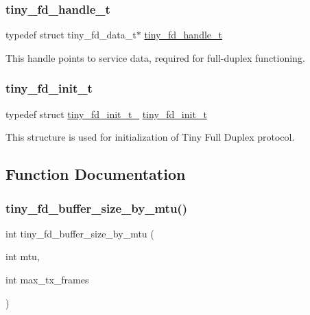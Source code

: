 \subsubsection{\texorpdfstring{tiny\+\_\+fd\+\_\+handle\+\_\+t}{tiny\_fd\_handle\_t}}
{\footnotesize\ttfamily typedef struct tiny\+\_\+fd\+\_\+data\+\_\+t$\ast$ \hyperlink{group__FULL__DUPLEX__API_ga91e6b79431fe38570fb102701ef0b7e8}{tiny\+\_\+fd\+\_\+handle\+\_\+t}}

This handle points to service data, required for full-\/duplex functioning. \mbox{\label{group__FULL__DUPLEX__API_gad19ac27f4ba1d2b807e0a440b0c927d2}} 
\subsubsection{\texorpdfstring{tiny\+\_\+fd\+\_\+init\+\_\+t}{tiny\_fd\_init\_t}}
{\footnotesize\ttfamily typedef struct \hyperlink{structtiny__fd__init__t__}{tiny\+\_\+fd\+\_\+init\+\_\+t\+\_\+}  \hyperlink{group__FULL__DUPLEX__API_gad19ac27f4ba1d2b807e0a440b0c927d2}{tiny\+\_\+fd\+\_\+init\+\_\+t}}

This structure is used for initialization of Tiny Full Duplex protocol. 

\subsection{Function Documentation}
\mbox{\label{group__FULL__DUPLEX__API_ga19789bea5b5acd68804773f0d6b0e3f7}} 
\subsubsection{\texorpdfstring{tiny\+\_\+fd\+\_\+buffer\+\_\+size\+\_\+by\+\_\+mtu()}{tiny\_fd\_buffer\_size\_by\_mtu()}}
{\footnotesize\ttfamily int tiny\+\_\+fd\+\_\+buffer\+\_\+size\+\_\+by\+\_\+mtu (\begin{DoxyParamCaption}\item[{int}]{mtu,  }\item[{int}]{max\+\_\+tx\+\_\+frames }\end{DoxyParamCaption})}


